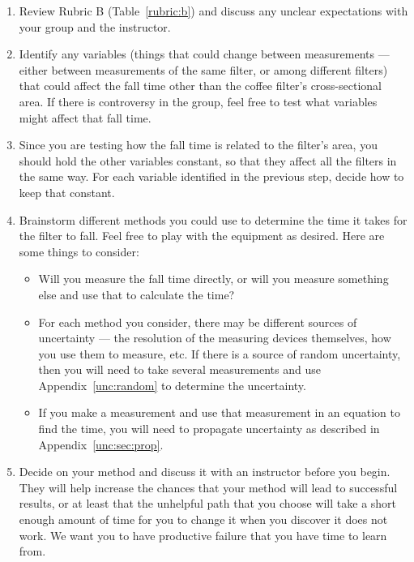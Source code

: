 \begin{enumerate}
	\item Review Rubric B (Table~\ref{rubric:b}) and discuss any unclear expectations with your group and the instructor.
	
	\item Identify any variables (things that could change between measurements --- either between measurements of the same filter, or among different filters) that could affect the fall time other than the coffee filter's cross-sectional area. If there is controversy in the group, feel free to test what variables might affect that fall time.
	
	\item Since you are testing how the fall time is related to the filter's area, you should hold the other variables constant, so that they affect all the filters in the same way. For each variable identified in the previous step, decide how to keep that constant.
	
	\item Brainstorm different methods you could use to determine the time it takes for the filter to fall. Feel free to play with the equipment as desired. Here are some things to consider:
	\begin{itemize}
		
		\item Will you measure the fall time directly, or will you measure something else and use that to calculate the time?
		
		\item For each method you consider, there may be different sources of uncertainty --- the resolution of the measuring devices themselves, how you use them to measure, etc. If there is a source of random uncertainty, then you will need to take several measurements and use Appendix~\ref{unc:random} to determine the uncertainty.
		
		\item If you make a measurement and use that measurement in an equation to find the time, you will need to propagate uncertainty as described in Appendix~\ref{unc:sec:prop}.
	\end{itemize}
		
	\item Decide on your method and discuss it with an instructor before you begin. They will help increase the chances that your method will lead to successful results, or at least that the unhelpful path that you choose will take a short enough amount of time for you to change it when you discover it does not work. We want you to have productive failure that you have time to learn from.
	

\end{enumerate}
